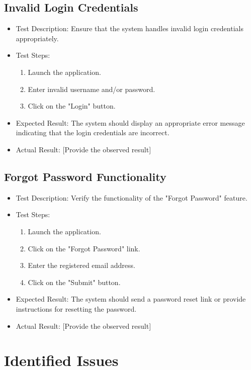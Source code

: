\documentclass{article}
\begin{document}
\subsection{Invalid Login Credentials}
\begin{itemize}
  \item Test Description: Ensure that the system handles invalid login credentials appropriately.
  \item Test Steps:
  \begin{enumerate}
    \item Launch the application.
    \item Enter invalid username and/or password.
    \item Click on the "Login" button.
  \end{enumerate}
  \item Expected Result: The system should display an appropriate error message indicating that the login credentials are incorrect.
  \item Actual Result: [Provide the observed result]
\end{itemize}

\subsection{Forgot Password Functionality}
\begin{itemize}
  \item Test Description: Verify the functionality of the "Forgot Password" feature.
  \item Test Steps:
  \begin{enumerate}
    \item Launch the application.
    \item Click on the "Forgot Password" link.
    \item Enter the registered email address.
    \item Click on the "Submit" button.
  \end{enumerate}
  \item Expected Result: The system should send a password reset link or provide instructions for resetting the password.
  \item Actual Result: [Provide the observed result]
\end{itemize}

\section{Identified Issues}
\end{document}
